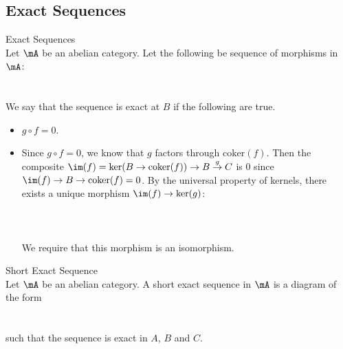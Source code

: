 \documentclass[a4paper]{article}
\begin{document}
\subsection{Exact Sequences}
\begin{defn}{Exact Sequences}{}\\
Let $\mA$ be an abelian category. Let the following be sequence of morphisms in $\mA$: \\
\\~\\
We say that the sequence is exact at $B$ if the following are true. 
\begin{itemize}
\item $g\circ f=0$. 
\item Since $g\circ f=0$, we know that $g$ factors through $\text{coker}(f)$. Then the composite $\im(f)=\ker(B\to\text{coker}(f))\to B\overset{g}{\to} C$ is $0$ since $\im(f)\to B\to\text{coker}(f)=0$. By the universal property of kernels, there exists a unique morphism $\im(f)\to\ker(g)$: \\~\\
\\~\\
We require that this morphism is an isomorphism. 
\end{itemize}
\end{defn}

\begin{defn}{Short Exact Sequence}{}\\
Let $\mA$ be an abelian category. A short exact sequence in $\mA$ is a diagram of the form \\
\\~\\
such that the sequence is exact in $A$, $B$ and $C$. 
\end{defn}
\end{document}
